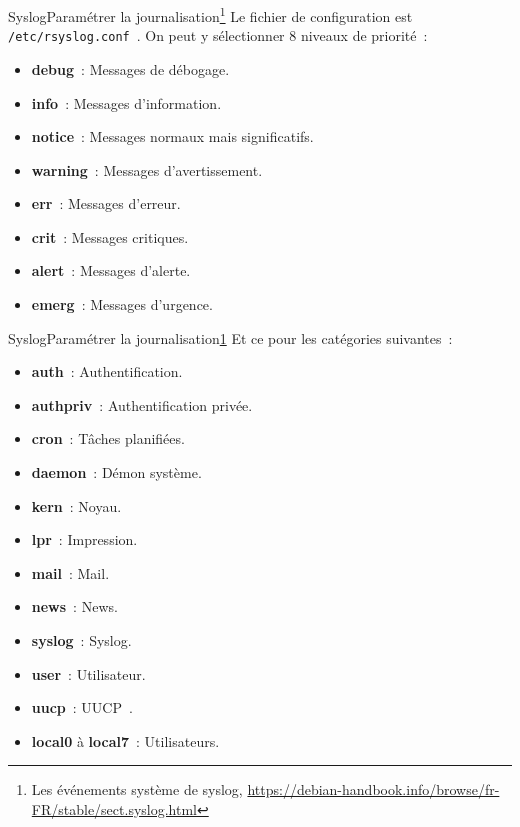 \documentclass{beamer}
\begin{document}
    \begin{frame}{Syslog}{Paramétrer la journalisation\footnote{\label{syslog}Les événements système de syslog, \url{https://debian-handbook.info/browse/fr-FR/stable/sect.syslog.html}}}
        Le fichier de configuration est \lstinline{/etc/rsyslog.conf}~.
        \bigbreak
        On peut y sélectionner 8 niveaux de priorité~:
        \begin{itemize}
            \item \textbf{debug}~: Messages de débogage.
            \item \textbf{info}~: Messages d'information.
            \item \textbf{notice}~: Messages normaux mais significatifs.
            \item \textbf{warning}~: Messages d'avertissement.
            \item \textbf{err}~: Messages d'erreur.
            \item \textbf{crit}~: Messages critiques.
            \item \textbf{alert}~: Messages d'alerte.
            \item \textbf{emerg}~: Messages d'urgence.
        \end{itemize}
    \end{frame}

    \begin{frame}{Syslog}{Paramétrer la journalisation\cref{syslog}}
        Et ce pour les catégories suivantes~:
        \begin{itemize}
            \item \textbf{auth}~: Authentification.
            \item \textbf{authpriv}~: Authentification privée.
            \item \textbf{cron}~: Tâches planifiées.
            \item \textbf{daemon}~: Démon système.
            \item \textbf{kern}~: Noyau.
            \item \textbf{lpr}~: Impression.
            \item \textbf{mail}~: Mail.
            \item \textbf{news}~: News.
            \item \textbf{syslog}~: Syslog.
            \item \textbf{user}~: Utilisateur.
            \item \textbf{uucp}~: UUCP~.
            \item \textbf{local0} à \textbf{local7}~: Utilisateurs.
        \end{itemize}
    \end{frame}
\end{document}
